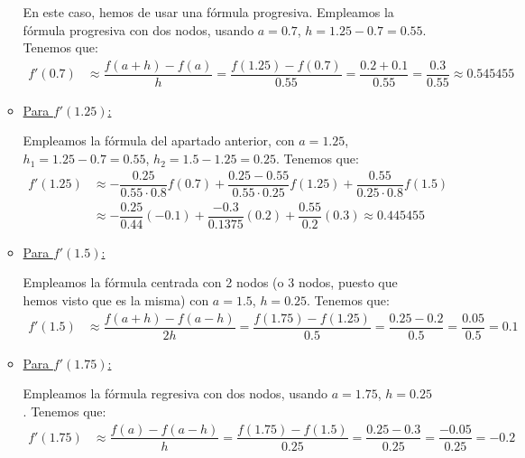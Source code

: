 \begin{ejercicio}
\begin{enumerate}
\begin{itemize}
            En este caso, hemos de usar una fórmula progresiva. Empleamos la fórmula progresiva con dos nodos, usando $a=0.7$, $h=1.25-0.7=0.55$. Tenemos que:
            \begin{align*}
                f'(0.7) &\approx \dfrac{f(a+h) - f(a)}{h} = \dfrac{f(1.25) - f(0.7)}{0.55} = \dfrac{0.2 + 0.1}{0.55} = \dfrac{0.3}{0.55} \approx 0.545455
            \end{align*}

            \item \ul{Para $f'(1.25)$:}
            
            Empleamos la fórmula del apartado anterior, con $a=1.25$, $h_1=1.25-0.7=0.55$, $h_2=1.5-1.25=0.25$. Tenemos que:
            \begin{align*}
                f'(1.25) &\approx -\dfrac{0.25}{0.55\cdot 0.8}f(0.7) + \dfrac{0.25-0.55}{0.55\cdot 0.25}f(1.25) + \dfrac{0.55}{0.25\cdot 0.8}f(1.5)\\
                &\approx -\dfrac{0.25}{0.44}(-0.1) + \dfrac{-0.3}{0.1375}(0.2) + \dfrac{0.55}{0.2}(0.3) \approx 0.445455
            \end{align*}

            \item \ul{Para $f'(1.5)$:}
            
            Empleamos la fórmula centrada con 2 nodos (o 3 nodos, puesto que hemos visto que es la misma) con $a=1.5$, $h=0.25$. Tenemos que:
            \begin{align*}
                f'(1.5) &\approx \dfrac{f(a+h) - f(a-h)}{2h} = \dfrac{f(1.75) - f(1.25)}{0.5} = \dfrac{0.25 - 0.2}{0.5} = \dfrac{0.05}{0.5} = 0.1
            \end{align*}

            \item \ul{Para $f'(1.75)$:}
            
            Empleamos la fórmula regresiva con dos nodos, usando $a=1.75$, $h=0.25$. Tenemos que:
            \begin{align*}
                f'(1.75) &\approx \dfrac{f(a) - f(a-h)}{h} = \dfrac{f(1.75) - f(1.5)}{0.25} = \dfrac{0.25 - 0.3}{0.25} = \dfrac{-0.05}{0.25} = -0.2
            \end{align*}
        \end{itemize}
    \end{enumerate}
\end{ejercicio}

